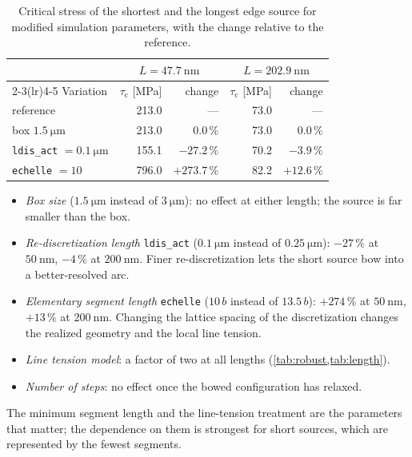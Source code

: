 \documentclass[11pt,a4paper]{article}
\numberwithin{equation}{section}
\theoremstyle{remark}
\newcommand{\tauc}{\tau_{\mathrm{c}}}
\begin{document}
\begin{table}[ht]
  \centering
  \caption{Critical stress of the shortest and the longest edge source for modified simulation
    parameters, with the change relative to the reference.}
  \label{tab:params}
  \begin{tabular}{lrrrr}
    \toprule
    & \multicolumn{2}{c}{$L = \SI{47.7}{\nano\metre}$} & \multicolumn{2}{c}{$L = \SI{202.9}{\nano\metre}$} \\
    \cmidrule(lr){2-3}\cmidrule(lr){4-5}
    Variation & $\tauc$ [MPa] & change & $\tauc$ [MPa] & change \\
    \midrule
    reference & 213.0 & --- & 73.0 & --- \\
    box $\SI{1.5}{\micro\metre}$ & 213.0 & $0.0\,\%$ & 73.0 & $0.0\,\%$ \\
    \texttt{ldis\_act} $= \SI{0.1}{\micro\metre}$ & 155.1 & $-27.2\,\%$ & 70.2 & $-3.9\,\%$ \\
    \texttt{echelle} $= 10$ & 796.0 & $+273.7\,\%$ & 82.2 & $+12.6\,\%$ \\
    \bottomrule
  \end{tabular}
\end{table}
\begin{itemize}\setlength{\itemsep}{2pt}
  \item \emph{Box size} ($\SI{1.5}{\micro\metre}$ instead of $\SI{3}{\micro\metre}$): no effect at either
    length; the source is far smaller than the box.
  \item \emph{Re-discretization length} \texttt{ldis\_act} ($\SI{0.1}{\micro\metre}$ instead of
    $\SI{0.25}{\micro\metre}$): $-27\,\%$ at $\SI{50}{\nano\metre}$, $-4\,\%$ at $\SI{200}{\nano\metre}$.
    Finer re-discretization lets the short source bow into a better-resolved arc.
  \item \emph{Elementary segment length} \texttt{echelle} ($10\,b$ instead of $13.5\,b$): $+274\,\%$ at
    $\SI{50}{\nano\metre}$, $+13\,\%$ at $\SI{200}{\nano\metre}$. Changing the lattice spacing of the
    discretization changes the realized geometry and the local line tension.
  \item \emph{Line tension model}: a factor of two at all lengths (\cref{tab:robust,tab:length}).
  \item \emph{Number of steps}: no effect once the bowed configuration has relaxed.
\end{itemize}
The minimum segment length and the line-tension treatment are the parameters that matter; the
dependence on them is strongest for short sources, which are represented by the fewest segments.
\end{document}
